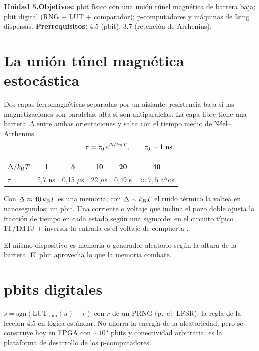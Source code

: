 \documentclass[11pt,a4paper]{article}
\begin{document}

\noindent\textbf{Unidad 5.}\quad\textbf{Objetivos:} pbit físico con una unión túnel magnética de barrera baja; pbit digital (RNG + LUT + comparador);
p-computadores y máquinas de Ising dispersas.
\textbf{Prerrequisitos:} 4.5 (pbit), 3.7 (retención de Arrhenius).

\section{La unión túnel magnética estocástica}
Dos capas ferromagnéticas separadas por un aislante: resistencia baja si las magnetizaciones son paralelas, alta si son antiparalelas. La capa libre
tiene una barrera $\Delta$ entre ambas orientaciones y salta con el tiempo medio de Néel--Arrhenius
\begin{equation}
\tau=\tau_0\,e^{\Delta/k_{\mathrm B} T},\qquad\tau_0\sim1\ \text{ns}.
\end{equation}
\begin{center}\begin{tabular}{lccccc}\toprule
$\Delta/k_{\mathrm B} T$ & 1 & 5 & 10 & 20 & 40\\\midrule
$\tau$ & 2,7 ns & 0,15 $\mu$s & 22 $\mu$s & 0,49 s & $\approx7{,}5$ años\\\bottomrule\end{tabular}\end{center}
Con $\Delta\approx40\,k_{\mathrm B} T$ es una memoria; con $\Delta\sim k_{\mathrm B} T$ el ruido térmico la voltea en nanosegundos: un pbit. Una corriente o voltaje que inclina el
pozo doble ajusta la fracción de tiempo en cada estado según una sigmoide; en el circuito típico 1T/1MTJ + inversor la entrada es el voltaje de compuerta
\cite{camsari}.
\begin{intuicion}
El mismo dispositivo es memoria o generador aleatorio según la altura de la barrera. El pbit aprovecha lo que la memoria combate.
\end{intuicion}

\section{pbits digitales}
$s=\mathrm{sgn}(\mathrm{LUT}_{\tanh}(u)-r)$ con $r$ de un PRNG (p.~ej. LFSR): la regla de la lección 4.5 en lógica estándar. No ahorra la energía de la
aleatoriedad, pero se construye hoy en FPGA con $\sim10^5$ pbits y conectividad arbitraria: es la plataforma de desarrollo de los p-computadores.
\end{document}
